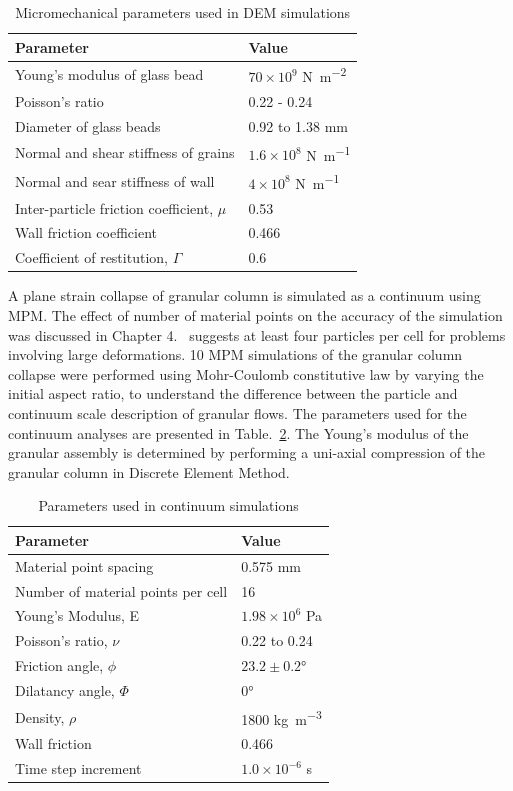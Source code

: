 \begin{table}
\caption{Micromechanical parameters used in DEM simulations}
\label{table:MDdata}
\centering
\begin{tabular}{ll}
\toprule
\textbf{Parameter} & \textbf{Value} \\ \midrule
Young's modulus of glass bead & $70\times10^{9}$ \si{\newton\per\m\squared}\\ 
Poisson's ratio & 0.22 - 0.24\\ 
Diameter of glass beads & 0.92 to 1.38 \si{\mm}\\
Normal and shear stiffness of grains & $1.6 \times 10^{8}$ \si{\newton\per\m}\\ 
Normal and sear stiffness of wall & $4 \times 10^{8}$ \si{\newton\per\m}\\
Inter-particle friction coefficient, $\mu$ & 0.53 \\
Wall friction coefficient & 0.466 \\ 
Coefficient of restitution, $\Gamma$ & 0.6 \\ \bottomrule
\end{tabular}
\end{table}

A plane strain collapse of granular column is simulated as a continuum using 
MPM. The effect of number of material points on the accuracy of the simulation 
was discussed in Chapter 4.~\citet{Guilkey2003} suggests at least four 
particles per cell for problems involving large deformations. 10 MPM 
simulations of the granular column collapse were performed using Mohr-Coulomb 
constitutive law by varying the initial aspect ratio, to understand the 
difference between the particle and continuum scale description of granular 
flows. The parameters used for the continuum analyses are presented in 
Table.~\ref{table:MPMData}. The Young's modulus of the granular assembly is 
determined by performing a uni-axial compression of the granular column in 
Discrete Element Method.

\begin{table}
\caption{Parameters used in continuum simulations}
\label{table:MPMData}
\centering
\begin{tabular}{ll}
\toprule
\textbf{Parameter} & \textbf{Value} \\ \midrule
Material point spacing & 0.575 \si{\mm} \\
Number of material points per cell & 16 \\
Young's Modulus, E & $1.98 \times 10 ^{6}$ \si{\Pa} \\
Poisson's ratio, $\nu$ & 0.22 to 0.24 \\ 
Friction angle, $\phi$ & $23.2 \pm 0.2\si{\degree}$ \\
Dilatancy angle, $\varPhi$ & $0$\si{\degree} \\
Density, $\rho$ & 1800 \si{\kg\per\m\cubed}\\
Wall friction & 0.466 \\
Time step increment & $1.0 \times 10^{-6}$ \si{\second}\\ \bottomrule
\end{tabular}
\end{table}
